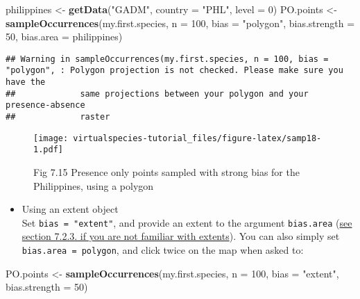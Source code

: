\documentclass[]{article}
\newenvironment{Shaded}{\begin{snugshade}}{\end{snugshade}}
\newcommand{\KeywordTok}[1]{\textcolor[rgb]{0.13,0.29,0.53}{\textbf{#1}}}
\newcommand{\DataTypeTok}[1]{\textcolor[rgb]{0.13,0.29,0.53}{#1}}
\newcommand{\DecValTok}[1]{\textcolor[rgb]{0.00,0.00,0.81}{#1}}
\newcommand{\StringTok}[1]{\textcolor[rgb]{0.31,0.60,0.02}{#1}}
\newcommand{\NormalTok}[1]{#1}
\providecommand{\tightlist}{%
  \setlength{\itemsep}{0pt}\setlength{\parskip}{0pt}}
\begin{document}
\begin{Shaded}
\begin{Highlighting}[]
\NormalTok{philippines <-}\StringTok{ }\KeywordTok{getData}\NormalTok{(}\StringTok{"GADM"}\NormalTok{, }\DataTypeTok{country =} \StringTok{"PHL"}\NormalTok{, }\DataTypeTok{level =} \DecValTok{0}\NormalTok{)}
\NormalTok{PO.points <-}\StringTok{ }\KeywordTok{sampleOccurrences}\NormalTok{(my.first.species,}
                               \DataTypeTok{n =} \DecValTok{100}\NormalTok{, }
                               \DataTypeTok{bias =} \StringTok{"polygon"}\NormalTok{,}
                               \DataTypeTok{bias.strength =} \DecValTok{50}\NormalTok{,}
                               \DataTypeTok{bias.area =}\NormalTok{ philippines)}
\end{Highlighting}
\end{Shaded}

\begin{verbatim}
## Warning in sampleOccurrences(my.first.species, n = 100, bias = "polygon", : Polygon projection is not checked. Please make sure you have the 
##             same projections between your polygon and your presence-absence
##             raster
\end{verbatim}

\begin{figure}
\centering
\texttt{[image: virtualspecies-tutorial\_files/figure-latex/samp18-1.pdf]}
\caption{Fig 7.15 Presence only points sampled with strong bias for the
Philippines, using a polygon}
\end{figure}

\begin{itemize}
\tightlist
\item
  Using an extent object\\
  Set \texttt{bias\ =\ "extent"}, and provide an extent to the argument
  \texttt{bias.area} (\protect\hyperlink{providing-an-extent-object}{see
  section 7.2.3. if you are not familiar with extents}). You can also
  simply set \texttt{bias.area\ =\ polygon}, and click twice on the map
  when asked to:
\end{itemize}

\begin{Shaded}
\begin{Highlighting}[]
\NormalTok{PO.points <-}\StringTok{ }\KeywordTok{sampleOccurrences}\NormalTok{(my.first.species,}
                               \DataTypeTok{n =} \DecValTok{100}\NormalTok{, }
                               \DataTypeTok{bias =} \StringTok{"extent"}\NormalTok{,}
                               \DataTypeTok{bias.strength =} \DecValTok{50}\NormalTok{)}
\end{Highlighting}
\end{Shaded}
\end{document}

